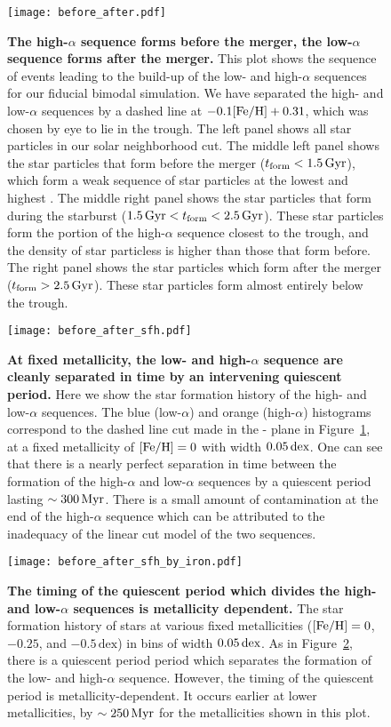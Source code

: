 \begin{figure*}
  \centering
  \texttt{[image: before\_after.pdf]}
  \caption{\textbf{The high-$\alpha$ sequence forms before the merger, the low-$\alpha$ sequence forms after the merger.} This plot shows the sequence of events leading to the build-up of the low- and high-$\alpha$ sequences for our fiducial bimodal simulation. We have separated the high- and low-$\alpha$ sequences by a dashed line at $-0.1[\textrm{Fe}/\textrm{H}] + 0.31$, which was chosen by eye to lie in the trough. The left panel shows all star particles in our solar neighborhood cut. The middle left panel shows the star particles that form before the merger ($t_{\textrm{form}} < 1.5\,\textrm{Gyr}$), which form a weak sequence of star particles at the lowest \FeH and highest \MgFe. The middle right panel shows the star particles that form during the starburst ($1.5\,\textrm{Gyr} < t_{\textrm{form}} < 2.5\,\textrm{Gyr}$). These star particles form the portion of the high-$\alpha$ sequence closest to the trough, and the density of star particless is higher than those that form before. The right panel shows the star particles which form after the merger ($t_{\textrm{form}} > 2.5\,\textrm{Gyr}$). These star particles form almost entirely below the trough.}
  \label{fig:before_after}
\end{figure*}

\begin{figure}
  \centering
  \texttt{[image: before\_after\_sfh.pdf]}
  \caption{\textbf{At fixed metallicity, the low- and high-$\alpha$ sequence are cleanly separated in time by an intervening quiescent period.} Here we show the star formation history of the high- and low-$\alpha$ sequences. The blue (low-$\alpha$) and orange (high-$\alpha$) histograms correspond to the dashed line cut made in the \MgFe{}-\FeH{} plane in Figure~\ref{fig:before_after}, at a fixed metallicity of $[\textrm{Fe}/\textrm{H}]=0$ with width $0.05\,\textrm{dex}$. One can see that there is a nearly perfect separation in time between the formation of the high-$\alpha$ and low-$\alpha$ sequences by a quiescent period lasting $\sim300\,\textrm{Myr}$. There is a small amount of contamination at the end of the high-$\alpha$ sequence which can be attributed to the inadequacy of the linear cut model of the two sequences.}
  \label{fig:before_after_sfh}
\end{figure}

\begin{figure}
  \centering
  \texttt{[image: before\_after\_sfh\_by\_iron.pdf]}
  \caption{\textbf{The timing of the quiescent period which divides the high- and low-$\alpha$ sequences is metallicity dependent.} The star formation history of stars at various fixed metallicities ($[\textrm{Fe}/\textrm{H}]=0$, $-0.25$, and $-0.5\,\textrm{dex}$) in bins of width $0.05\,\textrm{dex}$. As in Figure~\ref{fig:before_after_sfh}, there is a quiescent period period which separates the formation of the low- and high-$\alpha$ sequence. However, the timing of the quiescent period is metallicity-dependent. It occurs earlier at lower metallicities, by $\sim250\,\textrm{Myr}$ for the metallicities shown in this plot.}
  \label{fig:before_after_sfh_by_iron}
\end{figure}

